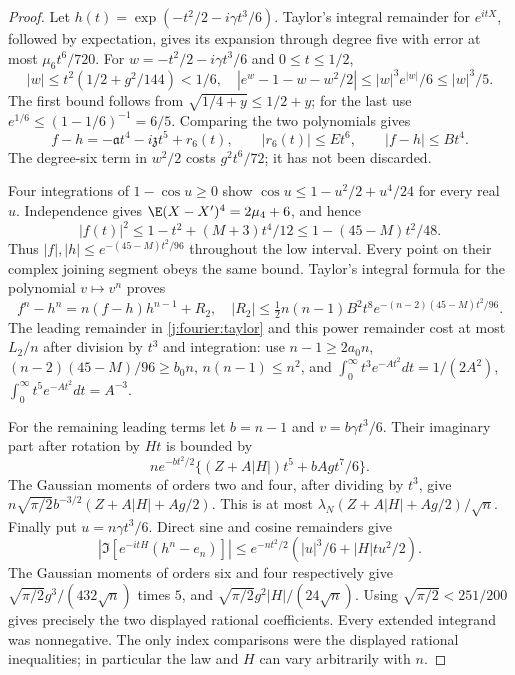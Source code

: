 \begin{proof}
Let $h(t)=\exp(-t^2/2-i\gamma t^3/6)$. Taylor's integral remainder
for $e^{itX}$, followed by expectation, gives its expansion through
degree five with error at most $\mu_6t^6/720$. For
$w=-t^2/2-i\gamma t^3/6$ and $0\le t\le1/2$,
\[
 |w|\le t^2(1/2+g^2/144)<1/6,
 \quad |e^w-1-w-w^2/2|\le |w|^3e^{|w|}/6\le |w|^3/5.
\]
The first bound follows from $\sqrt{1/4+y}\le1/2+y$; for the last
use $e^{1/6}\le(1-1/6)^{-1}=6/5$. Comparing the two polynomials gives
\begin{equation}\label{j:fourier:taylor}
 f-h=-\mathfrak a t^4-i\mathfrak z t^5+r_6(t),\qquad |r_6(t)|\le Et^6,
 \qquad |f-h|\le Bt^4.
\end{equation}
The degree-six term in $w^2/2$ costs $g^2t^6/72$; it has not been
discarded.

Four integrations of $1-\cos u\ge0$ show
$\cos u\le1-u^2/2+u^4/24$ for every real $u$. Independence gives
$\E(X-X')^4=2\mu_4+6$, and hence
\[
 |f(t)|^2\le1-t^2+(M+3)t^4/12
 \le1-(45-M)t^2/48.
\]
Thus $|f|,|h|\le e^{-(45-M)t^2/96}$ throughout the low interval.
Every point on their complex joining segment obeys the same bound.
Taylor's integral formula for the polynomial $v\mapsto v^n$ proves
\[
 f^n-h^n=n(f-h)h^{n-1}+R_2,\quad
 |R_2|\le\tfrac12n(n-1)B^2t^8e^{-(n-2)(45-M)t^2/96}.
\]
The leading remainder in \eqref{j:fourier:taylor} and this power
remainder cost at most $L_2/n$ after division by $t^3$ and integration:
use $n-1\ge2a_0n$, $(n-2)(45-M)/96\ge b_0n$, $n(n-1)\le n^2$,
and $\int_0^\infty t^3e^{-At^2}dt=1/(2A^2)$,
$\int_0^\infty t^5e^{-At^2}dt=A^{-3}$.

For the remaining leading terms let $b=n-1$ and
$v=b\gamma t^3/6$. Their imaginary part after rotation by $Ht$ is
bounded by
\[
 ne^{-bt^2/2}\{(Z+A|H|)t^5+bAg t^7/6\}.
\]
The Gaussian moments of orders two and four, after dividing by $t^3$,
give $n\sqrt{\pi/2}b^{-3/2}(Z+A|H|+Ag/2)$.
This is at most $\lambda_N(Z+A|H|+Ag/2)/\sqrt n$.
Finally put $u=n\gamma t^3/6$. Direct sine and cosine remainders give
\[
 |\Im[e^{-itH}(h^n-e_n)]|
 \le e^{-nt^2/2}(|u|^3/6+|H|t u^2/2).
\]
The Gaussian moments of orders six and four respectively give
$\sqrt{\pi/2}g^3/(432\sqrt n)$ times $5$, and
$\sqrt{\pi/2}g^2|H|/(24\sqrt n)$.
Using $\sqrt{\pi/2}<251/200$ gives precisely the two displayed
rational coefficients. Every extended integrand was nonnegative.
The only index comparisons were the displayed rational inequalities;
in particular the law and $H$ can vary arbitrarily with $n$.
\end{proof}


